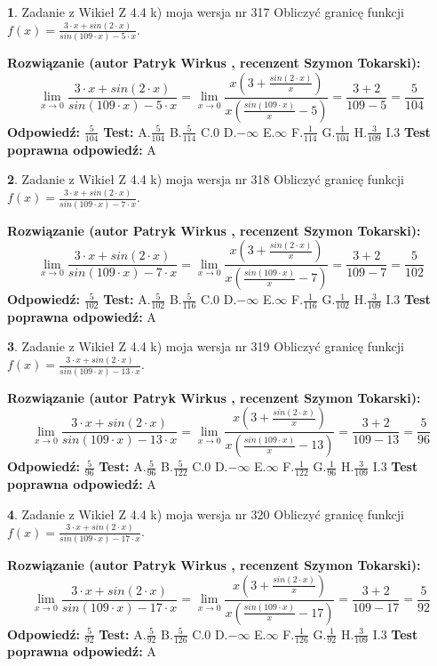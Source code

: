 \documentclass[12pt, a4paper]{article}
\theoremstyle{definition} %
\newtheorem{zad}{}
\newcommand{\zadStart}[1]{\begin{zad}#1\newline}
\newcommand{\zadStop}{\end{zad}}
\newcommand{\rozwStart}[2]{\noindent \textbf{Rozwiązanie (autor #1 , recenzent #2): }\newline}
\newcommand{\rozwStop}{\newline}
\newcommand{\odpStart}{\noindent \textbf{Odpowiedź:}\newline}
\newcommand{\odpStop}{\newline}
\newcommand{\testStart}{\noindent \textbf{Test:}\newline}
\newcommand{\testStop}{\newline}
\newcommand{\kluczStart}{\noindent \textbf{Test poprawna odpowiedź:}\newline}
\newcommand{\kluczStop}{\newline}
\begin{document}
\zadStart{Zadanie z Wikieł Z 4.4 k) moja wersja nr 317}
Obliczyć granicę funkcji $f(x)=\frac{3\cdot x +sin(2\cdot x)}{sin(109\cdot x) -5\cdot x}$.
\zadStop
\rozwStart{Patryk Wirkus}{Szymon Tokarski}
$$\lim\limits_{x\to 0}\frac{3\cdot x +sin(2\cdot x)}{sin(109\cdot x) -5\cdot x}
=\lim\limits_{x\to 0}\frac{x(3+\frac{sin(2\cdot x)}{x})}{x(\frac{sin(109\cdot x)}{x}-5)}
=\frac{3+2}{109-5} = \frac{5}{104}$$
\rozwStop
\odpStart
$\frac{5}{104}$
\odpStop
\testStart
A.$\frac{5}{104}$
B.$\frac{5}{114}$
C.$0$
D.$-\infty$
E.$\infty$
F.$\frac{1}{114}$
G.$\frac{1}{104}$
H.$\frac{3}{109}$
I.$3$
\testStop
\kluczStart
A
\kluczStop



\zadStart{Zadanie z Wikieł Z 4.4 k) moja wersja nr 318}
Obliczyć granicę funkcji $f(x)=\frac{3\cdot x +sin(2\cdot x)}{sin(109\cdot x) -7\cdot x}$.
\zadStop
\rozwStart{Patryk Wirkus}{Szymon Tokarski}
$$\lim\limits_{x\to 0}\frac{3\cdot x +sin(2\cdot x)}{sin(109\cdot x) -7\cdot x}
=\lim\limits_{x\to 0}\frac{x(3+\frac{sin(2\cdot x)}{x})}{x(\frac{sin(109\cdot x)}{x}-7)}
=\frac{3+2}{109-7} = \frac{5}{102}$$
\rozwStop
\odpStart
$\frac{5}{102}$
\odpStop
\testStart
A.$\frac{5}{102}$
B.$\frac{5}{116}$
C.$0$
D.$-\infty$
E.$\infty$
F.$\frac{1}{116}$
G.$\frac{1}{102}$
H.$\frac{3}{109}$
I.$3$
\testStop
\kluczStart
A
\kluczStop



\zadStart{Zadanie z Wikieł Z 4.4 k) moja wersja nr 319}
Obliczyć granicę funkcji $f(x)=\frac{3\cdot x +sin(2\cdot x)}{sin(109\cdot x) -13\cdot x}$.
\zadStop
\rozwStart{Patryk Wirkus}{Szymon Tokarski}
$$\lim\limits_{x\to 0}\frac{3\cdot x +sin(2\cdot x)}{sin(109\cdot x) -13\cdot x}
=\lim\limits_{x\to 0}\frac{x(3+\frac{sin(2\cdot x)}{x})}{x(\frac{sin(109\cdot x)}{x}-13)}
=\frac{3+2}{109-13} = \frac{5}{96}$$
\rozwStop
\odpStart
$\frac{5}{96}$
\odpStop
\testStart
A.$\frac{5}{96}$
B.$\frac{5}{122}$
C.$0$
D.$-\infty$
E.$\infty$
F.$\frac{1}{122}$
G.$\frac{1}{96}$
H.$\frac{3}{109}$
I.$3$
\testStop
\kluczStart
A
\kluczStop



\zadStart{Zadanie z Wikieł Z 4.4 k) moja wersja nr 320}
Obliczyć granicę funkcji $f(x)=\frac{3\cdot x +sin(2\cdot x)}{sin(109\cdot x) -17\cdot x}$.
\zadStop
\rozwStart{Patryk Wirkus}{Szymon Tokarski}
$$\lim\limits_{x\to 0}\frac{3\cdot x +sin(2\cdot x)}{sin(109\cdot x) -17\cdot x}
=\lim\limits_{x\to 0}\frac{x(3+\frac{sin(2\cdot x)}{x})}{x(\frac{sin(109\cdot x)}{x}-17)}
=\frac{3+2}{109-17} = \frac{5}{92}$$
\rozwStop
\odpStart
$\frac{5}{92}$
\odpStop
\testStart
A.$\frac{5}{92}$
B.$\frac{5}{126}$
C.$0$
D.$-\infty$
E.$\infty$
F.$\frac{1}{126}$
G.$\frac{1}{92}$
H.$\frac{3}{109}$
I.$3$
\testStop
\kluczStart
A
\kluczStop
\end{document}
